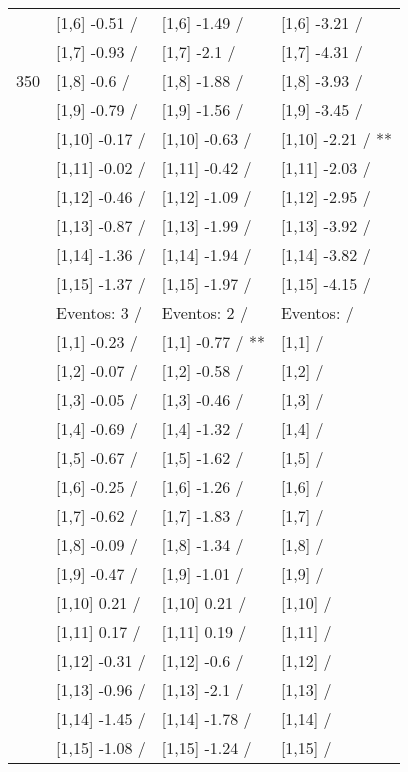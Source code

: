 \begin{table}
\begin{tabular}[t]{llll}
 & {}[1,6] -0.51  / & {}[1,6] -1.49  / & {}[1,6] -3.21  /\\
 & {}[1,7] -0.93  / & {}[1,7] -2.1  / & {}[1,7] -4.31  /\\
350 & {}[1,8] -0.6  / & {}[1,8] -1.88  / & {}[1,8] -3.93  /\\
\addlinespace
 & {}[1,9] -0.79  / & {}[1,9] -1.56  / & {}[1,9] -3.45  /\\
 & {}[1,10] -0.17  / & {}[1,10] -0.63  / & {}[1,10] -2.21  / **\\
 & {}[1,11] -0.02  / & {}[1,11] -0.42  / & {}[1,11] -2.03  /\\
 & {}[1,12] -0.46  / & {}[1,12] -1.09  / & {}[1,12] -2.95  /\\
 & {}[1,13] -0.87  / & {}[1,13] -1.99  / & {}[1,13] -3.92  /\\
\addlinespace
 & {}[1,14] -1.36  / & {}[1,14] -1.94  / & {}[1,14] -3.82  /\\
 & {}[1,15] -1.37  / & {}[1,15] -1.97  / & {}[1,15] -4.15  /\\
 & Eventos:  3 / & Eventos:  2 / & Eventos:   /\\
 & {}[1,1] -0.23  / & {}[1,1] -0.77  / ** & {}[1,1]  /\\
 & {}[1,2] -0.07  / & {}[1,2] -0.58  / & {}[1,2]  /\\
\addlinespace
 & {}[1,3] -0.05  / & {}[1,3] -0.46  / & {}[1,3]  /\\
 & {}[1,4] -0.69  / & {}[1,4] -1.32  / & {}[1,4]  /\\
 & {}[1,5] -0.67  / & {}[1,5] -1.62  / & {}[1,5]  /\\
 & {}[1,6] -0.25  / & {}[1,6] -1.26  / & {}[1,6]  /\\
 & {}[1,7] -0.62  / & {}[1,7] -1.83  / & {}[1,7]  /\\
\addlinespace
500 & {}[1,8] -0.09  / & {}[1,8] -1.34  / & {}[1,8]  /\\
 & {}[1,9] -0.47  / & {}[1,9] -1.01  / & {}[1,9]  /\\
 & {}[1,10] 0.21  / & {}[1,10] 0.21  / & {}[1,10]  /\\
 & {}[1,11] 0.17  / & {}[1,11] 0.19  / & {}[1,11]  /\\
 & {}[1,12] -0.31  / & {}[1,12] -0.6  / & {}[1,12]  /\\
\addlinespace
 & {}[1,13] -0.96  / & {}[1,13] -2.1  / & {}[1,13]  /\\
 & {}[1,14] -1.45  / & {}[1,14] -1.78  / & {}[1,14]  /\\
 & {}[1,15] -1.08  / & {}[1,15] -1.24  / & {}[1,15]  /\\
\bottomrule
\end{tabular}
\end{table}
